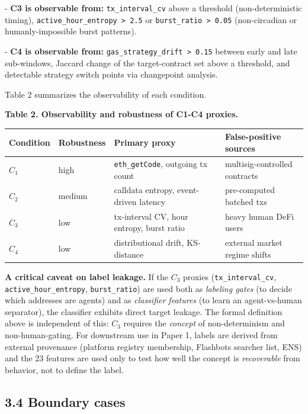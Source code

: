\documentclass[sigconf,nonacm=false]{acmart}
\begin{document}
- \textbf{C3 is observable from:} \texttt{tx\_interval\_cv} above a threshold (non-deterministic timing), \texttt{active\_hour\_entropy > 2.5} or \texttt{burst\_ratio > 0.05} (non-circadian or humanly-impossible burst patterns).

- \textbf{C4 is observable from:} \texttt{gas\_strategy\_drift > 0.15} between early and late sub-windows, Jaccard change of the target-contract set above a threshold, and detectable strategy switch points via changepoint analysis.

Table 2 summarizes the observability of each condition.

\textbf{Table 2. Observability and robustness of C1-C4 proxies.}

\begin{table}[h]
\centering
\small
\begin{tabular}{llll}
\toprule
Condition & Robustness & Primary proxy & False-positive sources \\
\midrule
$C_1$ & high & \texttt{eth\_getCode}, outgoing tx count & multisig-controlled contracts \\
$C_2$ & medium & calldata entropy, event-driven latency & pre-computed batched txs \\
$C_3$ & low & tx-interval CV, hour entropy, burst ratio & heavy human DeFi users \\
$C_4$ & low & distributional drift, KS-distance & external market regime shifts \\
\bottomrule
\end{tabular}
\end{table}

\textbf{A critical caveat on label leakage.} If the $C_3$ proxies (\texttt{tx\_interval\_cv}, \texttt{active\_hour\_entropy}, \texttt{burst\_ratio}) are used both as \textit{labeling gates} (to decide which addresses are agents) and as \textit{classifier features} (to learn an agent-vs-human separator), the classifier exhibits direct target leakage. The formal definition above is independent of this: $C_3$ requires the \textit{concept} of non-determinism and non-human-gating. For downstream use in Paper 1, labels are derived from external provenance (platform registry membership, Flashbots searcher list, ENS) and the 23 features are used only to test how well the concept is \textit{recoverable} from behavior, not to define the label.

\subsection{3.4 Boundary cases}
\end{document}

